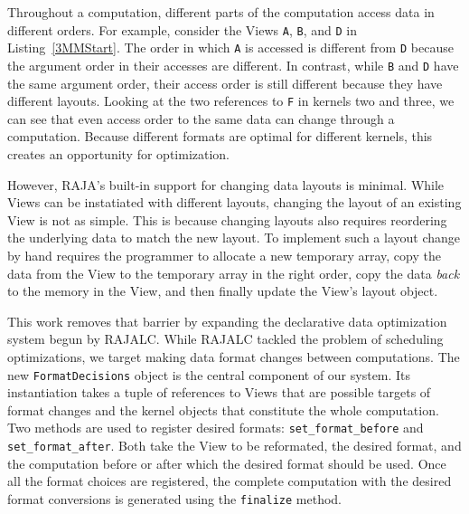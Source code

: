 \documentclass[sigconf]{acmart}
\begin{document}
Throughout a computation, different parts of the computation access data in different orders.
For example, consider the Views \verb.A., \verb.B., and \verb.D. in Listing~\ref{3MMStart}. 
The order in which \verb.A. is accessed is different from \verb.D. because the argument order in their accesses are different.
In contrast, while \verb.B. and \verb.D. have the same argument order, their access order is still different because they have different layouts.
Looking at the two references to \verb.F. in kernels two and three, we can see that even access order to the same data can change through a computation.
Because different formats are optimal for different kernels, this creates an opportunity for optimization. 

However, RAJA's built-in support for changing data layouts is minimal. 
While Views can be instatiated with different layouts, changing the layout of an existing View is not as simple.
This is because changing layouts also requires reordering the underlying data to match the new layout. 
To implement such a layout change by hand requires the programmer to allocate a new temporary array, 
copy the data from the View to the temporary array in the right order, 
copy the data \textit{back} to the memory in the View, 
and then finally update the View's layout object.

This work removes that barrier by expanding the declarative data optimization system begun by RAJALC.
While RAJALC tackled the problem of scheduling optimizations, we target making data format changes between computations. 
The new \verb.FormatDecisions. object is the central component of our system. 
Its instantiation takes a tuple of references to Views that are possible targets of format changes and the kernel objects that constitute the whole computation.
Two methods are used to register desired formats: \verb.set_format_before. and \verb.set_format_after..
Both take the View to be reformated, the desired format, and the computation before or after which the desired format should be used.
Once all the format choices are registered, the complete computation with the desired format conversions is generated using the \verb.finalize. method.
\end{document}
